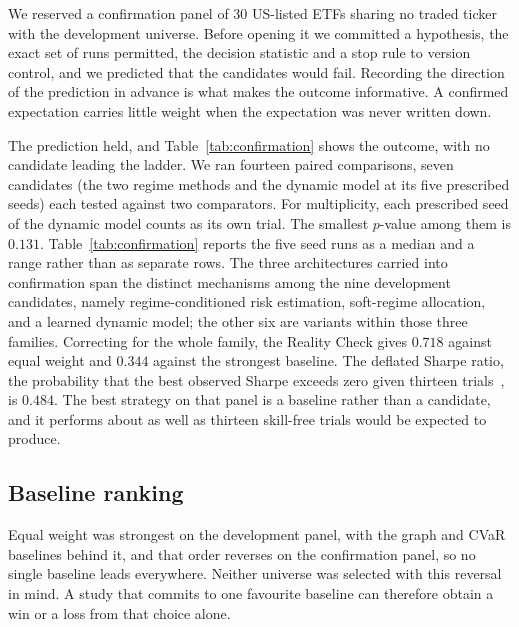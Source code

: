 \documentclass[sigconf,nonacm]{acmart}
\begin{document}


We reserved a confirmation panel of 30 US-listed ETFs sharing no traded ticker
with the development universe. Before opening it we committed a hypothesis, the
exact set of runs permitted, the decision statistic and a stop rule to version
control, and we predicted that the candidates would fail. Recording the
direction of the prediction in advance is what makes the outcome informative. A
confirmed expectation carries little weight when the expectation was never
written down.

The prediction held, and Table~\ref{tab:confirmation} shows the outcome, with
no candidate leading the ladder. We ran fourteen paired comparisons, seven
candidates (the two regime methods and the dynamic model at its five prescribed
seeds) each tested against two comparators. For multiplicity, each prescribed seed of the
dynamic model counts as its own trial. The smallest $p$-value among them is
$0.131$. Table~\ref{tab:confirmation} reports the five seed runs as a median and
a range rather than as separate rows. The three architectures carried into
confirmation span the distinct mechanisms among the nine development
candidates, namely regime-conditioned risk estimation, soft-regime allocation,
and a learned dynamic model; the other six are variants within those three
families. Correcting for
the whole family, the Reality Check gives $0.718$ against equal weight and
$0.344$ against the strongest baseline. The deflated Sharpe ratio, the probability that the best observed Sharpe exceeds
zero given thirteen trials~\cite{bailey2014deflated}, is $0.484$. The best
strategy on that panel is a baseline rather than a candidate, and it performs
about as well as thirteen skill-free trials would be expected to produce.

\setcounter{topnumber}{1}


\subsection{Baseline ranking}
Equal weight was strongest on the development panel, with the graph and CVaR
baselines behind it, and that order reverses on the confirmation panel, so no
single baseline leads everywhere. Neither universe was selected with this
reversal in mind. A study that commits to one favourite
baseline can therefore obtain a win or a loss from that choice alone.
\end{document}

